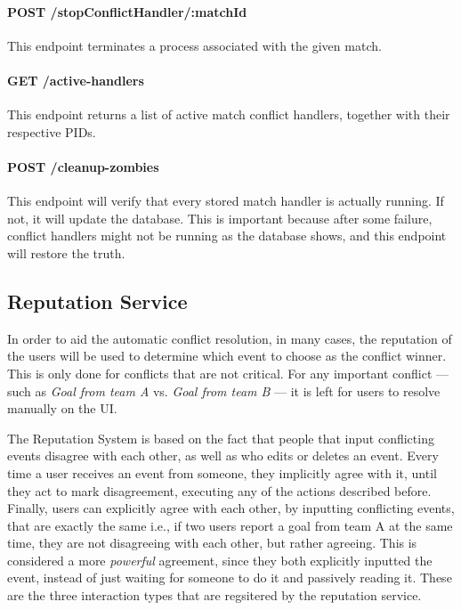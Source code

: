 \paragraph{POST /stopConflictHandler/:matchId}
This endpoint terminates a process associated with the given match.

\paragraph{GET /active-handlers}
This endpoint returns a list of active match conflict handlers, together with their respective PIDs.

\paragraph{POST /cleanup-zombies}
This endpoint will verify that every stored match handler is actually running. If not, it will update the database. This is important because after some failure, conflict handlers might not be running as the database shows, and this endpoint will restore the truth.

\subsection{Reputation Service}

In order to aid the automatic conflict resolution, in many cases, the reputation of the users will be used to determine which event to choose as the conflict winner. This is only done for conflicts that are not critical. For any important conflict --- such as \textit{Goal from team A} vs. \textit{Goal from team B} --- it is left for users to resolve manually on the UI.

The Reputation System is based on the fact that people that input conflicting events disagree with each other, as well as who edits or deletes an event. Every time a user receives an event from someone, they implicitly agree with it, until they act to mark disagreement, executing any of the actions described before. Finally, users can explicitly agree with each other, by inputting conflicting events, that are exactly the same i.e., if two users report a goal from team A at the same time, they are not disagreeing with each other, but rather agreeing. This is considered a more \textit{powerful} agreement, since they both explicitly inputted the event, instead of just waiting for someone to do it and passively reading it. These are the three interaction types that are regsitered by the reputation service.

